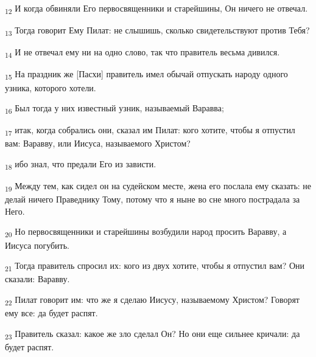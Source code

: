 \begin{tcolorbox}
\textsubscript{12} И когда обвиняли Его первосвященники и старейшины, Он ничего не отвечал.
\end{tcolorbox}
\begin{tcolorbox}
\textsubscript{13} Тогда говорит Ему Пилат: не слышишь, сколько свидетельствуют против Тебя?
\end{tcolorbox}
\begin{tcolorbox}
\textsubscript{14} И не отвечал ему ни на одно слово, так что правитель весьма дивился.
\end{tcolorbox}
\begin{tcolorbox}
\textsubscript{15} На праздник же [Пасхи] правитель имел обычай отпускать народу одного узника, которого хотели.
\end{tcolorbox}
\begin{tcolorbox}
\textsubscript{16} Был тогда у них известный узник, называемый Варавва;
\end{tcolorbox}
\begin{tcolorbox}
\textsubscript{17} итак, когда собрались они, сказал им Пилат: кого хотите, чтобы я отпустил вам: Варавву, или Иисуса, называемого Христом?
\end{tcolorbox}
\begin{tcolorbox}
\textsubscript{18} ибо знал, что предали Его из зависти.
\end{tcolorbox}
\begin{tcolorbox}
\textsubscript{19} Между тем, как сидел он на судейском месте, жена его послала ему сказать: не делай ничего Праведнику Тому, потому что я ныне во сне много пострадала за Него.
\end{tcolorbox}
\begin{tcolorbox}
\textsubscript{20} Но первосвященники и старейшины возбудили народ просить Варавву, а Иисуса погубить.
\end{tcolorbox}
\begin{tcolorbox}
\textsubscript{21} Тогда правитель спросил их: кого из двух хотите, чтобы я отпустил вам? Они сказали: Варавву.
\end{tcolorbox}
\begin{tcolorbox}
\textsubscript{22} Пилат говорит им: что же я сделаю Иисусу, называемому Христом? Говорят ему все: да будет распят.
\end{tcolorbox}
\begin{tcolorbox}
\textsubscript{23} Правитель сказал: какое же зло сделал Он? Но они еще сильнее кричали: да будет распят.
\end{tcolorbox}
